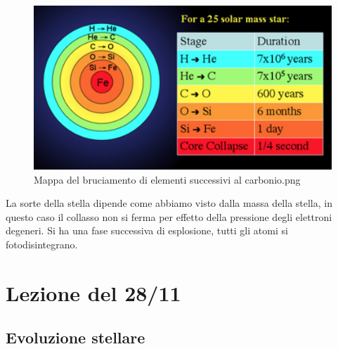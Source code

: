 \documentclass[a4paper,11pt]{article}
\begin{document}
\begin{figure}[h!!]
        \centering
        \includegraphics[width=12cm]{Mappa bruciamento elementi successivi.png}
        \caption{Mappa del bruciamento di elementi successivi al carbonio.png}
        \label{fig:Mappa bruciamento elementi successivi.png}
    \end{figure}

La sorte della stella dipende come abbiamo visto dalla massa della stella, in questo caso il collasso non si ferma per effetto della pressione degli elettroni degeneri. Si ha una fase successiva di esplosione, tutti gli atomi si fotodisintegrano.


\newpage
\section{Lezione del 28/11}
\subsection{Evoluzione stellare}
\end{document}
